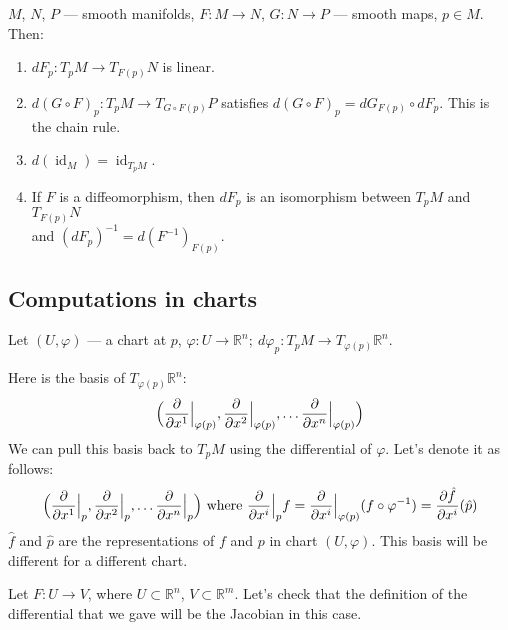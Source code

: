 \begin{proposition}
    $M$, $N$, $P$ --- smooth manifolds,
    $F : M \to N$, $G : N \to P$ --- smooth maps, $p \in M$. Then:
    \begin{enumerate}
        \item {
            $dF_p : T_p M \to T_{F(p)} N$ is linear.
        }
        \item {
            $d(G \circ F)_p : T_p M \to T_{G \circ F(p)} P$ satisfies
            $d(G \circ F)_p = dG_{F(p)} \circ dF_p$. This is the chain rule.
        }
        \item {
            $d(\operatorname{id}_M) = \operatorname{id}_{T_p M}$.
        }
        \item {
            If $F$ is a diffeomorphism, then $dF_p$ is an isomorphism
            between $T_p M$ and $T_{F(p)} N$\\ and
            $(dF_p)^{-1} = d(F^{-1})_{F(p)}$.
        }
    \end{enumerate}
\end{proposition}

\subsection{Computations in charts}
Let $(U, \varphi)$ --- a chart at $p$, $\varphi : U \to \mathbb{R}^n;\ 
d\varphi_p : T_p M \to T_{\varphi(p)} \mathbb{R}^n$.

Here is the basis of $T_{\varphi(p)} \mathbb{R}^n$:
\[\Bigl(
    \frac{\partial}{\partial x^1}\Big|_{\varphi(p)}, 
    \frac{\partial}{\partial x^2}\Big|_{\varphi(p)}, \dots
    \frac{\partial}{\partial x^n}\Big|_{\varphi(p)}
 \Bigr) \]
We can pull this basis back to $T_p M$ using the differential of $\varphi$.
Let's denote it as follows:
\[
    \Bigl(
        \frac{\partial}{\partial x^1}\Big|_p,
        \frac{\partial}{\partial x^2}\Big|_p, \dots
        \frac{\partial}{\partial x^n}\Big|_p
    \Bigr) 
    \text{ where }
    \frac{\partial}{\partial x^i}\Big|_p f =
    \frac{\partial}{\partial x^i}\Big|_{\varphi(p)} (f \circ \varphi^{-1}) =
    \frac{\partial \hat{f}}{\partial x^i}(\hat{p}) 
\]
$\hat{f}$ and $\hat{p}$ are the representations of $f$ and $p$ in chart $(U, \varphi)$.
This basis will be different for a different chart.

Let $F : U \to V$, where $U \subset \mathbb{R}^n$, $V \subset \mathbb{R}^m$.
Let's check that the definition of the differential that we gave
will be the Jacobian in this case.

